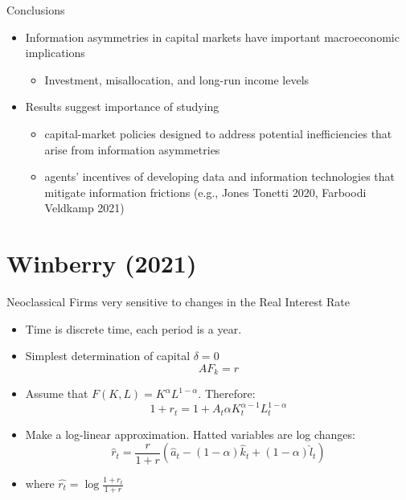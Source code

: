 \documentclass[english,xcolor=svgnames,aspectratio=169]{beamer}
\begin{document}
\begin{frame}{Conclusions}

\begin{itemize}

\item Information asymmetries in capital markets have important macroeconomic implications \smallskip
\begin{itemize}
\item Investment, misallocation, and long-run income levels
\end{itemize}
\bigskip
\item Results suggest importance of studying \medskip
\begin{itemize}
\item capital-market policies designed to address potential inefficiencies that arise from information asymmetries  \medskip
\item agents' incentives of developing data and information technologies that mitigate information frictions (e.g., Jones Tonetti 2020, Farboodi Veldkamp 2021)
\end{itemize}
\end{itemize}
\end{frame}

\section{Winberry (2021)}


\begin{frame}{Neoclassical Firms very sensitive to changes in the Real Interest Rate}
\begin{itemize}
\item Time is discrete time, each period is a year.
\item Simplest determination of capital $\delta = 0$
$$A F_k = r $$
\item Assume that $F(K,L) = K^{\alpha}L^{1-\alpha}$. Therefore:
$$1+r_t = 1+ A_t \alpha K_t^{\alpha-1}L_t^{1-\alpha}$$
\vspace{-0.5cm}
\item Make a log-linear approximation. Hatted variables are log changes:
$$\hat{r}_t = \frac{r}{1+r}\left(\hat{a}_t - (1-\alpha) \hat{k}_t + (1-\alpha) \hat{l}_t\right)$$
\vspace{-0.5cm}
\item where $\hat{r_t} = \log \frac{1+r_t}{1+r}$
\end{itemize}
\end{frame}
\end{document}
